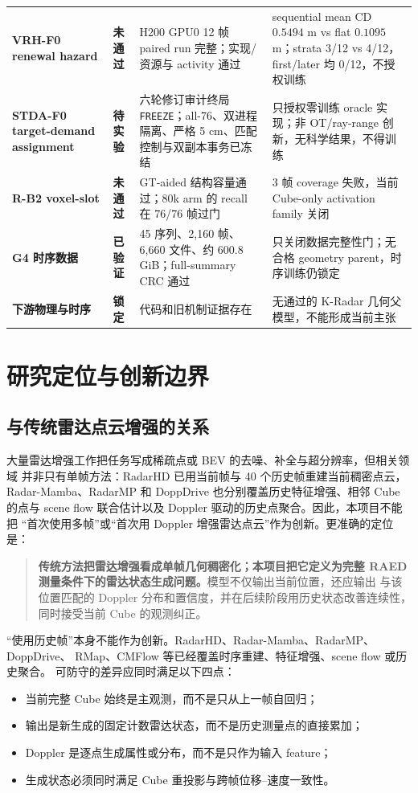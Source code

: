 \documentclass[11pt,a4paper,fontset=none]{ctexart}
\newcommand{\done}{\textcolor{RadarGreen}{\textbf{已验证}}}
\newcommand{\pending}{\textcolor{RadarOrange}{\textbf{待实验}}}
\newcommand{\closed}{\textcolor{RadarRed}{\textbf{未通过}}}
\newcommand{\locked}{\textcolor{RadarGray}{\textbf{锁定}}}
\newcommand{\code}[1]{\texttt{#1}}
\begin{document}
\begin{table}[H]
\begin{tabularx}{\textwidth}{>{\bfseries}p{2.2cm} p{2.3cm} Y Y}
VRH-F0 renewal hazard & \closed & H200 GPU0 12 帧 paired run 完整；实现/资源与 activity 通过 & sequential mean CD $0.5494$ m vs flat $0.1095$ m；strata 3/12 vs 4/12，first/later 均 0/12，不授权训练 \\
STDA-F0 target-demand assignment & \pending & 六轮修订审计终局 \code{FREEZE}；all-76、双进程隔离、严格 5 cm、匹配控制与双副本事务已冻结 & 只授权零训练 oracle 实现；非 OT/ray-range 创新，无科学结果，不得训练 \\
R-B2 voxel-slot & \closed & GT-aided 结构容量通过；80k arm 的 recall 在 76/76 帧过门 & 3 帧 coverage 失败，当前 Cube-only activation family 关闭 \\
G4 时序数据 & \done & 45 序列、2,160 帧、6,660 文件、约 600.8 GiB；full-summary CRC 通过 & 只关闭数据完整性门；无合格 geometry parent，时序训练仍锁定 \\
下游物理与时序 & \locked & 代码和旧机制证据存在 & 无通过的 K-Radar 几何父模型，不能形成当前主张 \\
\bottomrule
\end{tabularx}
\end{table}

\section{研究定位与创新边界}

\subsection{与传统雷达点云增强的关系}

大量雷达增强工作把任务写成稀疏点或 BEV 的去噪、补全与超分辨率，但相关领域
并非只有单帧方法：RadarHD 已用当前帧与 40 个历史帧重建当前稠密点云，
Radar-Mamba、RadarMP 和 DoppDrive 也分别覆盖历史特征增强、相邻 Cube 的点与
scene flow 联合估计以及 Doppler 驱动的历史点聚合。因此，本项目不能把
“首次使用多帧”或“首次用 Doppler 增强雷达点云”作为创新。更准确的定位是：
\begin{quote}
\textbf{传统方法把雷达增强看成单帧几何稠密化；本项目把它定义为完整
RAED 测量条件下的雷达状态生成问题。}模型不仅输出当前位置，还应输出
与该位置匹配的 Doppler 分布和置信度，并在后续阶段用历史状态改善连续性，
同时接受当前 Cube 的观测纠正。
\end{quote}

“使用历史帧”本身不能作为创新。RadarHD、Radar-Mamba、RadarMP、DoppDrive、
RMap、CMFlow 等已经覆盖时序重建、特征增强、scene flow 或历史聚合。
可防守的差异应同时满足以下四点：
\begin{itemize}
  \item 当前完整 Cube 始终是主观测，而不是只从上一帧自回归；
  \item 输出是新生成的固定计数雷达状态，而不是历史测量点的直接累加；
  \item Doppler 是逐点生成属性或分布，而不是只作为输入 feature；
  \item 生成状态必须同时满足 Cube 重投影与跨帧位移--速度一致性。
\end{itemize}
\end{document}

